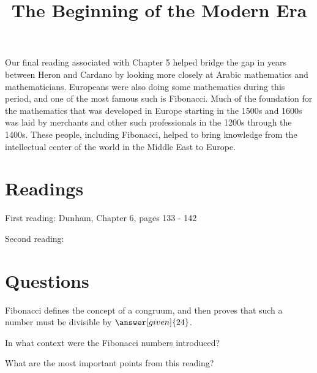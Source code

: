 \documentclass[nooutcomes]{ximera}
\title{The Beginning of the Modern Era}
\begin{document}
\begin{abstract}
    
\end{abstract}
\maketitle

Our final reading associated with Chapter 5 helped bridge the gap in years between Heron and Cardano by looking more closely at Arabic mathematics and mathematicians.  Europeans were also doing some mathematics during this period, and one of the most famous such is Fibonacci.  Much of the foundation for the mathematics that was developed in Europe starting in the 1500s and 1600s was laid by merchants and other such professionals in the 1200s through the 1400s.  These people, including Fibonacci, helped to bring knowledge from the intellectual center of the world in the Middle East to Europe.


\section{Readings}
First reading: Dunham, Chapter 6, pages 133 - 142

Second reading: 



\section{Questions}

\begin{question}
Fibonacci defines the concept of a congruum, and then proves that such a number must be divisible by $\answer[given]{24}$.
\end{question}

\begin{question}
In what context were the Fibonacci numbers introduced?
\begin{multipleChoice}
\end{multipleChoice}
\end{question}


\begin{question}
What are the most important points from this reading?
\begin{freeResponse}
\end{freeResponse}

\end{question}
\end{document}
